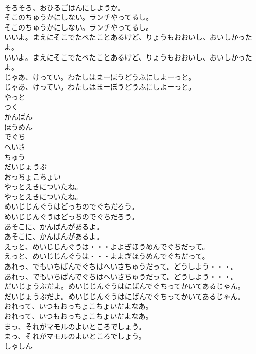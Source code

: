 \documentclass[8pt]{extreport}
\begin{document}
\begin{CJK}{UTF8}{min}
\\	そろそろ、おひるごはんにしようか。
\\	そこのちゅうかにしない。ランチやってるし。
\\	そこのちゅうかにしない。ランチやってるし。
\\	いいよ。まえにそこでたべたことあるけど、りょうもおおいし、おいしかったよ。
\\	いいよ。まえにそこでたべたことあるけど、りょうもおおいし、おいしかったよ。
\\	じゃあ、けってい。わたしはまーぼうどうふにしよーっと。
\\	じゃあ、けってい。わたしはまーぼうどうふにしよーっと。
\\	やっと
\\	つく
\\	かんばん
\\	ほうめん
\\	でぐち
\\	へいさ
\\	ちゅう
\\	だいじょうぶ
\\	おっちょこちょい
\\	やっとえきについたね。
\\	やっとえきについたね。
\\	めいじじんぐうはどっちのでぐちだろう。
\\	めいじじんぐうはどっちのでぐちだろう。
\\	あそこに、かんばんがあるよ。
\\	あそこに、かんばんがあるよ。
\\	えっと、めいじじんぐうは・・・よよぎほうめんでぐちだって。
\\	えっと、めいじじんぐうは・・・よよぎほうめんでぐちだって。
\\	あれっ、でもいちばんでぐちはへいさちゅうだって。どうしよう・・・。
\\	あれっ、でもいちばんでぐちはへいさちゅうだって。どうしよう・・・。
\\	だいじょうぶだよ。めいじじんぐうはにばんでぐちってかいてあるじゃん。
\\	だいじょうぶだよ。めいじじんぐうはにばんでぐちってかいてあるじゃん。
\\	おれって、いつもおっちょこちょいだよなあ。
\\	おれって、いつもおっちょこちょいだよなあ。
\\	まっ、それがマモルのよいところでしょう。
\\	まっ、それがマモルのよいところでしょう。
\\	しゃしん

\end{CJK}
\end{document}
